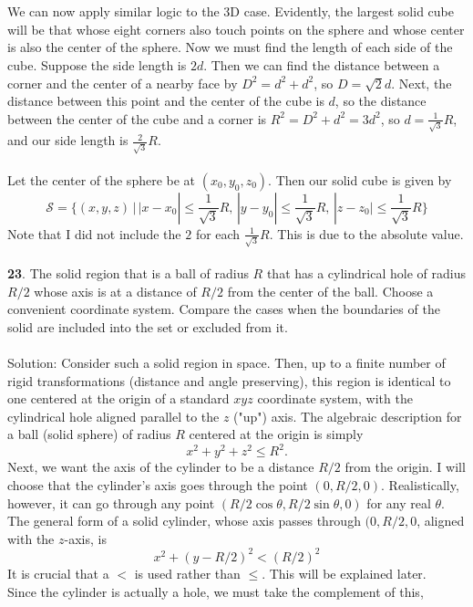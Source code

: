 \documentclass[12pt]{amsbook}
\let\cal\mathcal
\begin{document}
\\
\\
We can now apply similar logic to the 3D case. Evidently, the largest solid cube will be that whose eight corners also touch points on the sphere and whose center is also the center of the sphere. Now we must find the length of each side of the cube. Suppose the side length is $2d$. Then we can find the distance between a corner and the center of a nearby face by $D^2=d^2+d^2$, so $D=\sqrt{2}d$. Next, the distance between this point and the center of the cube is $d$, so the distance between the center of the cube and a corner is $R^2=D^2+d^2=3d^2$, so $d=\frac{1}{\sqrt{3}}R$, and our side length is $\frac{2}{\sqrt{3}}R$. 
\\
\\
Let the center of the sphere be at $(x_0,y_0,z_0)$. Then our solid cube is given by
$${\cal S}=\{(x,y,z)\,|\, |x-x_0|\leq \frac{1}{\sqrt{3}}R, \, |y-y_0|\leq \frac{1}{\sqrt{3}}R,\, 
 |z-z_0|\leq \frac{1}{\sqrt{3}}R\}$$ 
 Note that I did not include the $2$ for each $\frac{1}{\sqrt{3}}R$. This is due to the absolute value.
\\
\\
{\small\bf 23}. The solid region that is a ball of radius $R$
 that has a cylindrical hole
of radius $R/2$ whose axis is at a distance of $R/2$ from the
center of the ball. Choose a convenient coordinate system.
Compare the cases
when the boundaries of the solid are included into the set
or excluded from it.\\
\\
{\sc Solution}:
Consider such a solid region in space. Then, up to a finite number of rigid transformations (distance and angle preserving), this region is identical to one centered at the origin of a standard $xyz$ coordinate system, with the cylindrical hole aligned parallel to the $z$ ("up") axis. The algebraic description for a ball (solid sphere) of radius $R$ centered at the origin is simply 
$$x^2+y^2+z^2 \leq R^2.$$
Next, we want the axis of the cylinder to be a distance $R/2$ from the origin. I will choose that the cylinder's axis goes through the point $(0,R/2,0)$. Realistically, however, it can go through any point $(R/2\cos\theta, R/2\sin\theta,0)$ for any real $\theta$. The general form of a solid cylinder, whose axis passes through $(0,R/2,0$, aligned with the $z$-axis, is
$$x^2 + (y-R/2)^2 < (R/2)^2$$
It is crucial that a $<$ is used rather than $\leq$. This will be explained later.
\\
Since the cylinder is actually a hole, we must take the complement of this,
\end{document}
